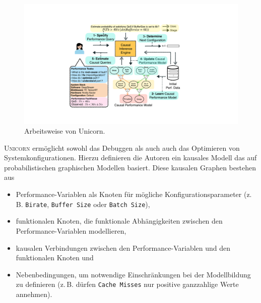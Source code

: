 \documentclass[11pt]{article}
\begin{document}
\begin{figure}[tp!]
  \centering
  \includegraphics[width=\linewidth]{./img/UnicornOverview.pdf}
  \caption{Arbeitsweise von Unicorn.}

  \label{}
\end{figure}

\textsc{Unicorn} ermöglicht sowohl das Debuggen als auch auch das Optimieren von Systemkonfigurationen. Hierzu definieren die Autoren ein kausales Modell das auf probabilistischen graphischen Modellen basiert. Diese kausalen Graphen bestehen aus

\begin{itemize}
  \itemsep0em
  \item Performance-Variablen als Knoten für mögliche Konfigurationsparameter (z.\,B. \texttt{Birate}, \texttt{Buffer Size} oder \texttt{Batch Size}),
  \item funktionalen Knoten, die funktionale Abhängigkeiten zwischen den Performance-Variablen modellieren,
  \item kausalen Verbindungen zwischen den Performance-Variablen und den funktionalen Knoten und
  \item Nebenbedingungen, um notwendige Einschränkungen bei der Modellbildung zu definieren (z.\,B. dürfen \texttt{Cache Misses} nur positive ganzzahlige Werte annehmen).
\end{itemize}
\end{document}
